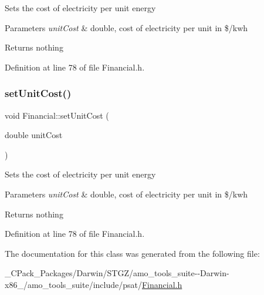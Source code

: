 Sets the cost of electricity per unit energy


\begin{DoxyParams}{Parameters}
{\em unit\+Cost} & double, cost of electricity per unit in \$/kwh\\
\hline
\end{DoxyParams}
\begin{DoxyReturn}{Returns}
nothing 
\end{DoxyReturn}


Definition at line 78 of file Financial.\+h.

\mbox{\label{class_financial_a84ead2ef72b2d348e05eb308d01e9265}} 
\subsubsection{\texorpdfstring{set\+Unit\+Cost()}{setUnitCost()}\hspace{0.1cm}{\footnotesize\ttfamily [3/3]}}
{\footnotesize\ttfamily void Financial\+::set\+Unit\+Cost (\begin{DoxyParamCaption}\item[{double}]{unit\+Cost }\end{DoxyParamCaption})\hspace{0.3cm}{\ttfamily [inline]}}

Sets the cost of electricity per unit energy


\begin{DoxyParams}{Parameters}
{\em unit\+Cost} & double, cost of electricity per unit in \$/kwh\\
\hline
\end{DoxyParams}
\begin{DoxyReturn}{Returns}
nothing 
\end{DoxyReturn}


Definition at line 78 of file Financial.\+h.



The documentation for this class was generated from the following file\+:\begin{DoxyCompactItemize}
\item 
\+\_\+\+C\+Pack\+\_\+\+Packages/\+Darwin/\+S\+T\+G\+Z/amo\+\_\+tools\+\_\+suite-\/-\/\+Darwin-\/x86\+\_/amo\+\_\+tools\+\_\+suite/include/psat/\hyperlink{___c_pack___packages_2_darwin_2_s_t_g_z_2amo__tools__suite--_darwin-x86__64_2amo__tools__suite_2include_2psat_2_financial_8h}{Financial.\+h}\end{DoxyCompactItemize}
